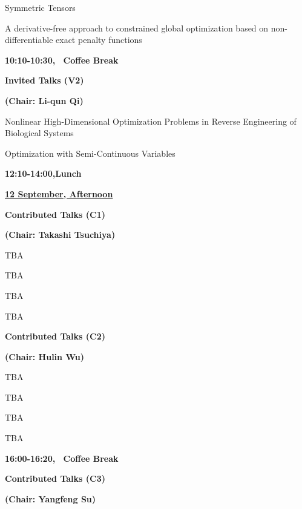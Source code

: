  {Symmetric Tensors}

 {A derivative-free approach to constrained global optimization based on non-differentiable exact penalty functions}

\vskip8mm \centerline{\bf 10:10-10:30, \ Coffee Break} \vskip8mm

\centerline{\bf Invited Talks (V2)} \vskip2mm \centerline{\bf
(Chair: Li-qun Qi)} \vskip4mm

 {Nonlinear High-Dimensional Optimization Problems in Reverse Engineering of Biological Systems}

 {Optimization with Semi-Continuous Variables}

\vskip16mm \centerline{\bf 12:10-14:00,\quad Lunch} \vskip16mm

\noindent
\parbox[t]{5cm}{\underline{\bf 12 September, Afternoon}}\hskip 2.2cm
\hskip10mm\parbox[t]{10cm}{}
\vskip10mm

\centerline{\bf Contributed Talks (C1)} \vskip2mm \centerline{\bf
(Chair: Takashi Tsuchiya)} \vskip4mm

 {TBA}

 {TBA}

 {TBA}

 {TBA}



\vskip8mm \centerline{\bf Contributed Talks (C2)} \vskip2mm
\centerline{\bf (Chair: Hulin Wu) } \vskip4mm

 {TBA}

 {TBA}

 {TBA}

 {TBA}

\vskip8mm \centerline{\bf 16:00-16:20, \ Coffee Break} \vskip8mm


\centerline{\bf Contributed Talks (C3)} \vskip2mm \centerline{\bf
(Chair: Yangfeng Su) } \vskip4mm

